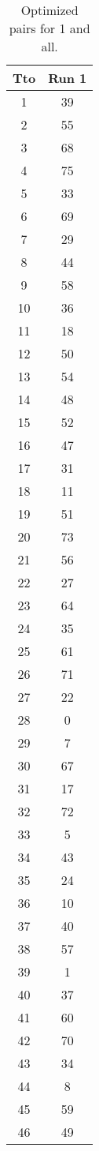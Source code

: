 \begin{table}
  \centering
  \scriptsize
  \caption{Optimized pairs for 1 and all.}
  \label{tab_pairs}
\begin{tabular}{c c }
\hline
Tto & Run 1 \\
\hline
1 & 39 \\
2 & 55 \\
3 & 68 \\
4 & 75 \\
5 & 33 \\
6 & 69 \\
7 & 29 \\
8 & 44 \\
9 & 58 \\
10 & 36 \\
11 & 18 \\
12 & 50 \\
13 & 54 \\
14 & 48 \\
15 & 52 \\
16 & 47 \\
17 & 31 \\
18 & 11 \\
19 & 51 \\
20 & 73 \\
21 & 56 \\
22 & 27 \\
23 & 64 \\
24 & 35 \\
25 & 61 \\
26 & 71 \\
27 & 22 \\
28 & 0 \\
29 & 7 \\
30 & 67 \\
31 & 17 \\
32 & 72 \\
33 & 5 \\
34 & 43 \\
35 & 24 \\
36 & 10 \\
37 & 40 \\
38 & 57 \\
39 & 1 \\
40 & 37 \\
41 & 60 \\
42 & 70 \\
43 & 34 \\
44 & 8 \\
45 & 59 \\
46 & 49 \\

\end{tabular}
\end{table}
